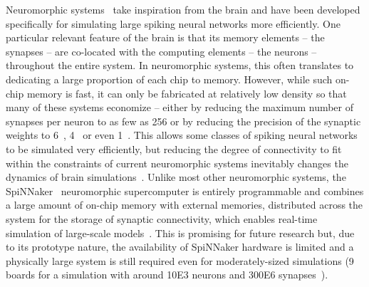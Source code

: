 \documentclass[9pt,twocolumn,twoside,lineno]{pnas-new}
\begin{document}
Neuromorphic systems~\citep{Frenkel2018,Frenkel2019,Furber2014,Merolla2014,Qiao2015,Schemmel2017} take inspiration from the brain and have been developed specifically for simulating large spiking neural networks more efficiently.
One particular relevant feature of the brain is that its memory elements -- the synapses -- are co-located with the computing elements -- the neurons -- throughout the entire system.
In neuromorphic systems, this often translates to dedicating a large proportion of each chip to memory.
However, while such on-chip memory is fast, it can only be fabricated at relatively low density so that many of these systems economize -- either by reducing the maximum number of synapses per neuron to as few as \num{256} or by reducing the precision of the synaptic weights to \num{6}~\citep{Schemmel2017}, \num{4}~\citep{Frenkel2018} or even \SI{1}{\bit}~\citep{Merolla2014,Frenkel2019}.
This allows some classes of spiking neural networks to be simulated very efficiently, but reducing the degree of connectivity to fit within the constraints of current neuromorphic systems inevitably changes the dynamics of brain simulations~\citep{VanAlbada2015}.
Unlike most other neuromorphic systems, the SpiNNaker~\citep{Furber2014} neuromorphic supercomputer is entirely programmable and combines a large amount of on-chip memory with external memories, distributed across the system for the storage of synaptic connectivity, which enables real-time simulation of large-scale models~\citep{Rhodes2019}.
This is promising for future research but, due to its prototype nature, the availability of SpiNNaker hardware is limited and a physically large system is still required even for moderately-sized simulations (9 boards for a simulation with around \num{10E3} neurons and \num{300E6} synapses~\citep{Rhodes2019}).
\end{document}
